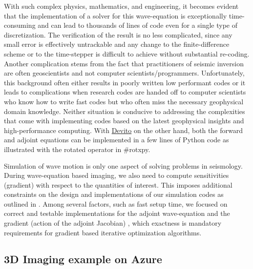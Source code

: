 \documentclass[conference]{IEEEtran}
\begin{document}
With such complex physics, mathematics, and engineering, it becomes
evident that the implementation of a solver for this wave-equation is
exceptionally time-consuming and can lead to thousands of lines of code
even for a single type of discretization. The verification of the result
is no less complicated, since any small error is effectively untrackable
and any change to the finite-difference scheme or to the time-stepper is
difficult to achieve without substantial re-coding. Another complication
stems from the fact that practitioners of seismic inversion are often
geoscientists and not computer scientists/programmers. Unfortunately,
this background often either results in poorly written low performant
codes or it leads to complications when research codes are handed off to
computer scientists who know how to write fast codes but who often miss
the necessary geophysical domain knowledge. Neither situation is
conducive to addressing the complexities that come with implementing
codes based on the latest geophysical insights and high-performance
computing. With \href{https://github.com/devitocodes/devito}{Devito} on
the other hand, both the forward and adjoint equations can be
implemented in a few lines of Python code as illustrated with the
rotated operator in \#rotxpy.

Simulation of wave motion is only one aspect of solving problems in
seismology. During wave-equation based imaging, we also need to compute
sensitivities (gradient) with respect to the quantities of interest.
This imposes additional constraints on the design and implementations of
our simulation codes as outlined in \cite{virieux}. Among several
factors, such as fast setup time, we focused on correct and testable
implementations for the adjoint wave-equation and the gradient (action
of the adjoint Jacobian)
\cite{louboutin2018segeow, louboutin2020THmfi}, which exactness is
mandatory requirements for gradient based iterative optimization
algorithms.

\subsection{3D Imaging example on
Azure}\label{d-imaging-example-on-azure}
\end{document}
